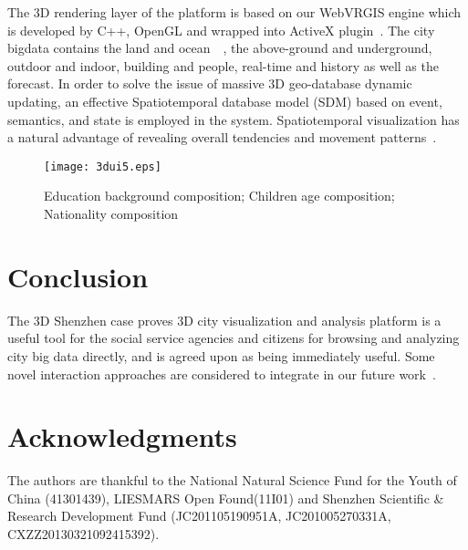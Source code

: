 \documentclass{vgtc}
\begin{document}
The 3D rendering layer of the platform is based on our WebVRGIS engine which is developed by C++, OpenGL and wrapped into ActiveX plugin~\cite{lviconip}. The city bigdata contains the land and ocean~\cite{su20143d}~\cite{lv20143d}, the above-ground and underground, outdoor and indoor, building and people, real-time and history as well as the forecast. In order to solve the issue of massive 3D geo-database dynamic updating, an effective Spatiotemporal database model (SDM) based on event, semantics, and state is employed in the system. Spatiotemporal visualization has a natural advantage 
of revealing overall tendencies and movement patterns~\cite{zhong2012spatiotemporal}.
\begin{figure}
    \begin{center}
    \texttt{[image: 3dui5.eps]}
    \caption{Education background composition; Children age composition; Nationality composition}
    \label{fig:3dui5}
        \end{center}
\end{figure}



\section{Conclusion}

The 3D Shenzhen case proves 3D city visualization and analysis platform is a useful tool for the social service agencies and citizens for browsing
and analyzing city big data directly, and is agreed upon as being immediately useful. Some novel interaction approaches are considered to integrate in our future work~\cite{lv2013wearable}.

\section*{Acknowledgments}
The authors are thankful to the National Natural Science Fund for the Youth of China (41301439), LIESMARS Open Found(11I01) and Shenzhen Scientific \& Research Development Fund (JC201105190951A, JC201005270331A, CXZZ20130321092415392).



\end{document}

